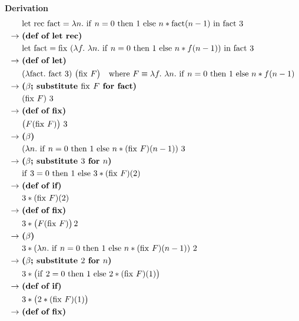 \documentclass{article}
\theoremstyle{theorem}
\theoremstyle{definition}
\theoremstyle{remark}
\begin{document}
\noindent\textbf{Derivation}
\[
\begin{aligned}
&\mathrm{let\ rec}\ \mathrm{fact}=\lambda n.\ \mathrm{if}\ n=0\ \mathrm{then}\ 1\ \mathrm{else}\ n * \mathrm{fact}(n-1)\ \mathrm{in}\ \mathrm{fact}\ 3\\
\to\ &\text{\textbf{(def of let rec)}}\\
&\mathrm{let}\ \mathrm{fact}=\mathrm{fix}\ (\lambda f.\ \lambda n.\ \mathrm{if}\ n=0\ \mathrm{then}\ 1\ \mathrm{else}\ n * f(n-1))\ \mathrm{in}\ \mathrm{fact}\ 3\\
\to\ &\text{\textbf{(def of let)}}\\
&(\lambda \mathrm{fact}.\ \mathrm{fact}\ 3)\ \big(\mathrm{fix}\ F\big)
\quad\text{where }F \equiv \lambda f.\ \lambda n.\ \mathrm{if}\ n=0\ \mathrm{then}\ 1\ \mathrm{else}\ n * f(n-1)\\
\to\ &\text{\textbf{($\beta$; substitute $\mathrm{fix}\ F$ for fact)}}\\
&(\mathrm{fix}\ F)\ 3\\
\to\ &\text{\textbf{(def of fix)}}\\
&\big(F(\mathrm{fix}\ F)\big)\ 3\\
\to\ &\text{\textbf{($\beta$)}}\\
&(\lambda n.\ \mathrm{if}\ n=0\ \mathrm{then}\ 1\ \mathrm{else}\ n * (\mathrm{fix}\ F)(n-1))\ 3\\
\to\ &\text{\textbf{($\beta$; substitute $3$ for $n$)}}\\
&\mathrm{if}\ 3=0\ \mathrm{then}\ 1\ \mathrm{else}\ 3 * (\mathrm{fix}\ F)(2)\\
\to\ &\text{\textbf{(def of if)}}\\
&3 * (\mathrm{fix}\ F)(2)\\
\to\ &\text{\textbf{(def of fix)}}\\
&3 * \big(F(\mathrm{fix}\ F)\big)\,2\\
\to\ &\text{\textbf{($\beta$)}}\\
&3 * (\lambda n.\ \mathrm{if}\ n=0\ \mathrm{then}\ 1\ \mathrm{else}\ n * (\mathrm{fix}\ F)(n-1))\ 2\\
\to\ &\text{\textbf{($\beta$; substitute $2$ for $n$)}}\\
&3 * \big(\mathrm{if}\ 2=0\ \mathrm{then}\ 1\ \mathrm{else}\ 2 * (\mathrm{fix}\ F)(1)\big)\\
\to\ &\text{\textbf{(def of if)}}\\
&3 * \big(2 * (\mathrm{fix}\ F)(1)\big)\\
\to\ &\text{\textbf{(def of fix)}}\\

\end{aligned}\]
\end{document}
